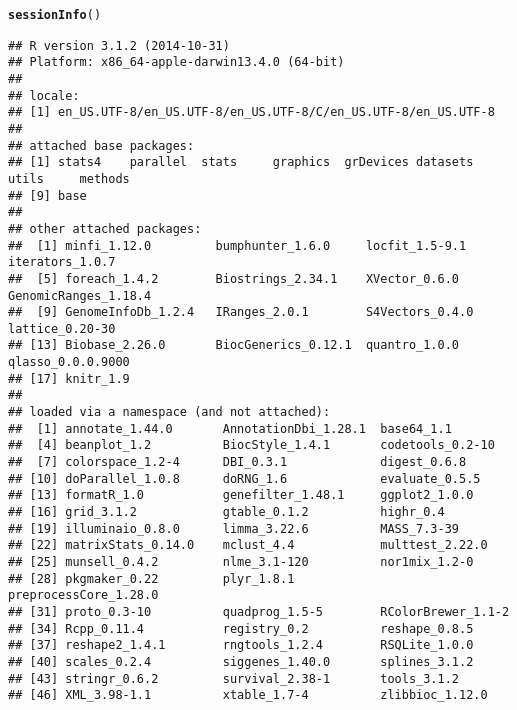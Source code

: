 \documentclass{article}\usepackage[]{graphicx}\usepackage[usenames,dvipsnames]{color}
\makeatletter
\newcommand{\hlstd}[1]{\textcolor[rgb]{0.345,0.345,0.345}{#1}}%
\newcommand{\hlkwd}[1]{\textcolor[rgb]{0.737,0.353,0.396}{\textbf{#1}}}%
\newenvironment{kframe}{%
 \def\at@end@of@kframe{}%
 \ifinner\ifhmode%
  \def\at@end@of@kframe{\end{minipage}}%
  \begin{minipage}{\columnwidth}%
 \fi\fi%
 \def\FrameCommand##1{\hskip\@totalleftmargin \hskip-\fboxsep
 \colorbox{shadecolor}{##1}\hskip-\fboxsep
     \hskip-\linewidth \hskip-\@totalleftmargin \hskip\columnwidth}%
 \MakeFramed {\advance\hsize-\width
   \@totalleftmargin\z@ \linewidth\hsize
   \@setminipage}}%
 {\par\unskip\endMakeFramed%
 \at@end@of@kframe}
\newenvironment{knitrout}{}{} %
\makeatother
\begin{document}
\begin{knitrout}
\color{fgcolor}\begin{kframe}
\begin{alltt}
\hlkwd{sessionInfo}\hlstd{()}
\end{alltt}
\begin{verbatim}
## R version 3.1.2 (2014-10-31)
## Platform: x86_64-apple-darwin13.4.0 (64-bit)
## 
## locale:
## [1] en_US.UTF-8/en_US.UTF-8/en_US.UTF-8/C/en_US.UTF-8/en_US.UTF-8
## 
## attached base packages:
## [1] stats4    parallel  stats     graphics  grDevices datasets  utils     methods  
## [9] base     
## 
## other attached packages:
##  [1] minfi_1.12.0         bumphunter_1.6.0     locfit_1.5-9.1       iterators_1.0.7     
##  [5] foreach_1.4.2        Biostrings_2.34.1    XVector_0.6.0        GenomicRanges_1.18.4
##  [9] GenomeInfoDb_1.2.4   IRanges_2.0.1        S4Vectors_0.4.0      lattice_0.20-30     
## [13] Biobase_2.26.0       BiocGenerics_0.12.1  quantro_1.0.0        qlasso_0.0.0.9000   
## [17] knitr_1.9           
## 
## loaded via a namespace (and not attached):
##  [1] annotate_1.44.0       AnnotationDbi_1.28.1  base64_1.1           
##  [4] beanplot_1.2          BiocStyle_1.4.1       codetools_0.2-10     
##  [7] colorspace_1.2-4      DBI_0.3.1             digest_0.6.8         
## [10] doParallel_1.0.8      doRNG_1.6             evaluate_0.5.5       
## [13] formatR_1.0           genefilter_1.48.1     ggplot2_1.0.0        
## [16] grid_3.1.2            gtable_0.1.2          highr_0.4            
## [19] illuminaio_0.8.0      limma_3.22.6          MASS_7.3-39          
## [22] matrixStats_0.14.0    mclust_4.4            multtest_2.22.0      
## [25] munsell_0.4.2         nlme_3.1-120          nor1mix_1.2-0        
## [28] pkgmaker_0.22         plyr_1.8.1            preprocessCore_1.28.0
## [31] proto_0.3-10          quadprog_1.5-5        RColorBrewer_1.1-2   
## [34] Rcpp_0.11.4           registry_0.2          reshape_0.8.5        
## [37] reshape2_1.4.1        rngtools_1.2.4        RSQLite_1.0.0        
## [40] scales_0.2.4          siggenes_1.40.0       splines_3.1.2        
## [43] stringr_0.6.2         survival_2.38-1       tools_3.1.2          
## [46] XML_3.98-1.1          xtable_1.7-4          zlibbioc_1.12.0
\end{verbatim}
\end{kframe}
\end{knitrout}
\end{document}
